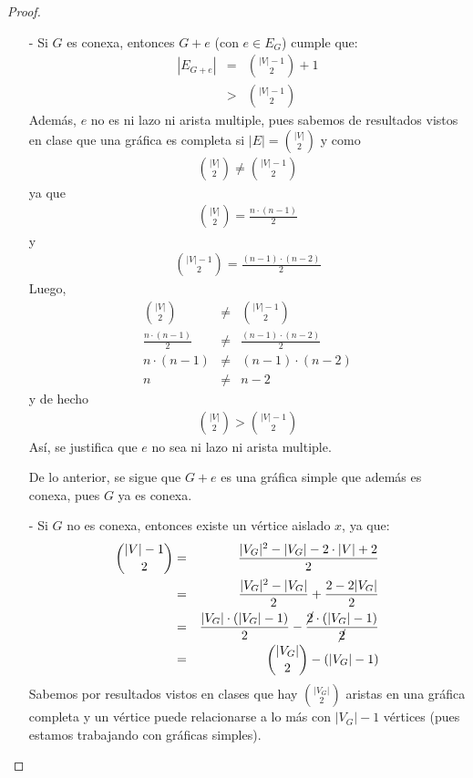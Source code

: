 \documentclass{article}
\begin{document}
\begin{enumerate}
\begin{enumerate}
\begin{proof}
        \begin{itemize}
          \item[-] Si $G$ es conexa, entonces $G+e$ (con $e \in E_G$) cumple que:
            \begin{eqnarray*}
              |E_{G +e}| &=& {|V| -1 \choose 2} +1\\
              &>& {|V| -1 \choose 2}
            \end{eqnarray*}
            Además, $e$ no es ni lazo ni arista multiple,
            pues sabemos de resultados vistos en clase que una gráfica es completa si
            $|E| = {|V| \choose 2}$ y como
            \begin{eqnarray*}
              {|V| \choose 2} \not= {|V| -1 \choose 2}
            \end{eqnarray*}
            ya que
            \begin{eqnarray*}
              {|V| \choose 2} = \frac{n \cdot (n -1)}{2}
            \end{eqnarray*}
            y
            \begin{eqnarray*}
              {|V| -1 \choose 2} = \frac{(n -1) \cdot (n -2)}{2}
            \end{eqnarray*}
            Luego,
            \begin{eqnarray*}
              {|V| \choose 2} &\not=& {|V| -1 \choose 2}\\
              \frac{n \cdot (n -1)}{2} &\not=& \frac{(n -1) \cdot (n -2)}{2}\\
              n \cdot (n -1) &\not=& (n -1) \cdot (n -2)\\
              n &\not=& n -2
            \end{eqnarray*}
            y de hecho
            \begin{eqnarray*}
              {|V| \choose 2} > {|V| -1 \choose 2}
            \end{eqnarray*}
            Así, se justifica que $e$ no sea ni lazo ni arista multiple.

            De lo anterior, se sigue que $G +e$ es una gráfica simple que además es conexa,
            pues $G$ ya es conexa.

          \item[-] Si $G$ no es conexa, entonces existe un vértice aislado $x$, ya que:
            \begin{eqnarray*}
              {|V| -1 \choose 2} &=& \frac{|V_G|^2 -|V_G| -2 \cdot |V| +2}{2}\\
              &=& \frac{|V_G|^2 -|V_G|}{2} + \frac{2 -2|V_G|}{2}\\
              &=& \frac{|V_G| \cdot (|V_G| -1)}{2} - \frac{\cancel{2} \cdot (|V_G| -1)}{\cancel{2}}\\
              &=& {|V_G| \choose 2} - (|V_G| -1)
            \end{eqnarray*}
            Sabemos por resultados vistos en clases que hay ${|V_G| \choose 2}$ aristas en
            una gráfica completa y un vértice puede relacionarse a lo más con $|V_G| -1$ vértices
            (pues estamos trabajando con gráficas simples).


\end{itemize}
\end{proof}
\end{enumerate}
\end{enumerate}
\end{document}

